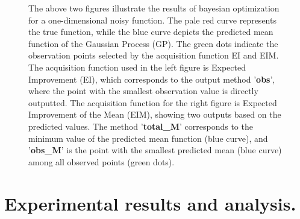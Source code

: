 \documentclass{article}
\begin{document}
\begin{figure}[H]
    \caption{The above two figures illustrate the results of bayesian optimization for a one-dimensional noisy function. The pale red curve represents the true function, while the blue curve depicts the predicted mean function of the Gaussian Process (GP). The green dots indicate the observation points selected by the acquisition function EI and EIM. The acquisition function used in the left figure is Expected Improvement (EI), which corresponds to the output method '\textbf{obs}', where the point with the smallest observation value is directly outputted. The acquisition function for the right figure is Expected Improvement of the Mean (EIM), showing two outputs based on the predicted values. The method '\textbf{total\_M}' corresponds to the minimum value of the predicted mean function (blue curve), and '\textbf{obs\_M}' is the point with the smallest predicted mean (blue curve) among all observed points (green dots).}
    \label{Fig1}
\end{figure}




\section{Experimental results and analysis.}
\end{document}
